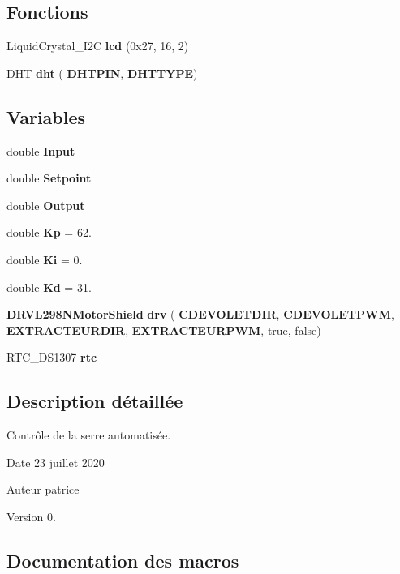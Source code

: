 \subsection*{Fonctions}
\begin{DoxyCompactItemize}
\item 
Liquid\+Crystal\+\_\+\+I2C \textbf{ lcd} (0x27, 16, 2)
\item 
D\+HT \textbf{ dht} (\textbf{ D\+H\+T\+P\+IN}, \textbf{ D\+H\+T\+T\+Y\+PE})
\end{DoxyCompactItemize}
\subsection*{Variables}
\begin{DoxyCompactItemize}
\item 
double \textbf{ Input}
\item 
double \textbf{ Setpoint}
\item 
double \textbf{ Output}
\item 
double \textbf{ Kp} = 62.
\item 
double \textbf{ Ki} = 0.
\item 
double \textbf{ Kd} = 31.
\item 
\textbf{ D\+R\+V\+L298\+N\+Motor\+Shield} \textbf{ drv} (\textbf{ C\+D\+E\+V\+O\+L\+E\+T\+D\+IR}, \textbf{ C\+D\+E\+V\+O\+L\+E\+T\+P\+WM}, \textbf{ E\+X\+T\+R\+A\+C\+T\+E\+U\+R\+D\+IR}, \textbf{ E\+X\+T\+R\+A\+C\+T\+E\+U\+R\+P\+WM}, true, false)
\item 
R\+T\+C\+\_\+\+D\+S1307 \textbf{ rtc}
\end{DoxyCompactItemize}


\subsection{Description détaillée}
Contrôle de la serre automatisée. 

\begin{DoxyDate}{Date}
23 juillet 2020 
\end{DoxyDate}
\begin{DoxyAuthor}{Auteur}
patrice 
\end{DoxyAuthor}
\begin{DoxyVersion}{Version}
0. 
\end{DoxyVersion}


\subsection{Documentation des macros}
\mbox{\label{_serre_auto_8cpp_a6fe5e728d855cb8aaf42f08ee62e1ee5}} 
